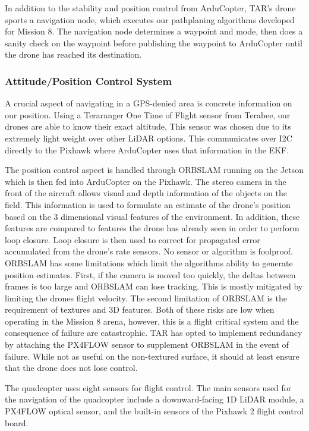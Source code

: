 \documentclass[12pt,letterpaper]{article}
\begin{document}
		In addition to the stability and position control from ArduCopter, TAR’s drone sports a navigation node, which executes our pathplaning algorithms developed for Mission 8. The navigation node determines a waypoint and mode, then does a sanity check on the waypoint before publishing the waypoint to ArduCopter until the drone has reached its destination.

		\subsubsection*{Attitude/Position Control System}

		A crucial aspect of navigating in a GPS-denied area is concrete information on our position. Using a Teraranger One Time of Flight sensor from Terabee, our drones are able to know their exact altitude. This sensor was chosen due to its extremely light weight over other LiDAR options. This communicates over I2C directly to the Pixhawk where ArduCopter uses that information in the EKF.

		The position control aspect is handled through ORBSLAM running on the Jetson which is then fed into ArduCopter on the Pixhawk. The stereo camera in the front of the aircraft allows visual and depth information of the objects on the field. This information is used to formulate an estimate of the drone’s position based on the 3 dimensional visual features of the environment. In addition, these features are compared to features the drone has already seen in order to perform loop closure. Loop closure is then used to correct for propagated error accumulated from the drone’s rate sensors. No sensor or algorithm is foolproof. ORBSLAM has some limitations which limit the algorithms ability to generate position estimates. First, if the camera is moved too quickly, the deltas between frames is too large and ORBSLAM can lose tracking. This is mostly mitigated by limiting the drones flight velocity. The second limitation of ORBSLAM is the requirement of textures and 3D features. Both of these risks are low when operating in the Mission 8 arena, however, this is a flight critical system and the consequence of failure are catastrophic. TAR has opted to implement redundancy by attaching the PX4FLOW sensor to supplement ORBSLAM in the event of failure. While not as useful on the non-textured surface, it should at least ensure that the drone does not lose control.

		The quadcopter uses eight sensors for flight control. The main sensors used for the navigation of the quadcopter include a downward-facing 1D LiDAR module, a PX4FLOW optical sensor, and the built-in sensors of the Pixhawk 2 flight control board.
\end{document}
